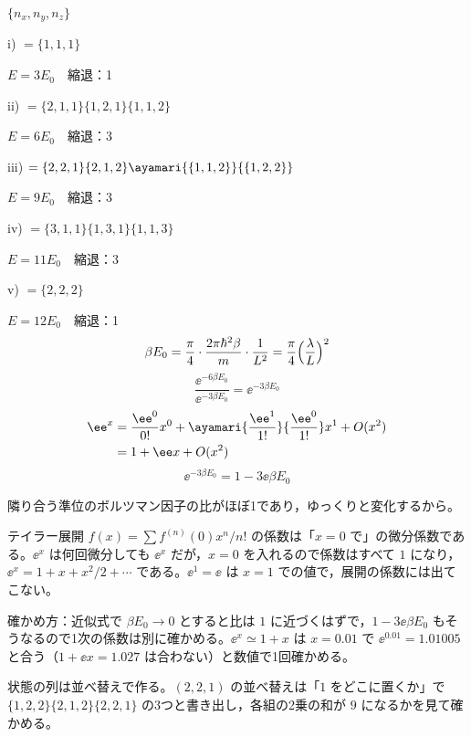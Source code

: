 $\{n_x,n_y,n_z\}$

i) $=\{1,1,1\}$

$E=3E_0$　縮退：1

ii) $=\{2,1,1\}\{1,2,1\}\{1,1,2\}$

$E=6E_0$　縮退：3

iii) $=\{2,2,1\}\{2,1,2\}\ayamari{\{1,1,2\}}{\{1,2,2\}}$

$E=9E_0$　縮退：3

iv) $=\{3,1,1\}\{1,3,1\}\{1,1,3\}$

$E=11E_0$　縮退：3

v) $=\{2,2,2\}$

$E=12E_0$　縮退：1
\[ \beta E_0=\frac{\pi}{4}\cdot\frac{2\pi\hbar^{2}\beta}{m}\cdot\frac{1}{L^{2}}=\frac{\pi}{4}\Bigl(\frac{\lambda}{L}\Bigr)^{2} \]
\[ \frac{\ee^{-6\beta E_0}}{\ee^{-3\beta E_0}}=\ee^{-3\beta E_0} \]
\begin{align*}
\ee^{x}&=\frac{\ee^{0}}{0!}x^{0}+\ayamari{\frac{\ee^{1}}{1!}}{\frac{\ee^{0}}{1!}}x^{1}+O(x^{2})\\
&=1+\ee x+O(x^{2})
\end{align*}
\[ \ee^{-3\beta E_0}=1-3\ee\beta E_0 \]

隣り合う準位のボルツマン因子の比がほぼ1であり，ゆっくりと変化するから。
\item テイラー展開 $f(x)=\sum f^{(n)}(0)x^{n}/n!$ の係数は「$x=0$ で」の微分係数である。$\ee^{x}$ は何回微分しても $\ee^{x}$ だが，$x=0$ を入れるので係数はすべて $1$ になり，$\ee^{x}=1+x+x^{2}/2+\cdots$ である。$\ee^{1}=\ee$ は $x=1$ での値で，展開の係数には出てこない。
\item 確かめ方：近似式で $\beta E_0\to0$ とすると比は $1$ に近づくはずで，$1-3\ee\beta E_0$ もそうなるので1次の係数は別に確かめる。$\ee^{x}\simeq1+x$ は $x=0.01$ で $\ee^{0.01}=1.01005$ と合う（$1+\ee x=1.027$ は合わない）と数値で1回確かめる。
\item 状態の列は並べ替えで作る。$(2,2,1)$ の並べ替えは「$1$ をどこに置くか」で $\{1,2,2\}\{2,1,2\}\{2,2,1\}$ の3つと書き出し，各組の2乗の和が $9$ になるかを見て確かめる。
